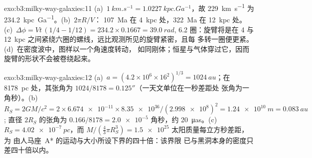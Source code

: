 \begin{solution}{exo:b3:milky-way-galaxies:11}
(a)~$\qty{1}{km.s^{-1}} = \qty{1.0227}{kpc.Ga^{-1}}$，故
\qty{229}{km.s^{-1}} 为 \qty{234.2}{kpc.Ga^{-1}}。(b)~$2\pi R/V$：
\qty{107}{Ma} 在 \qty{4}{kpc} 处，\qty{322}{Ma} 在 \qty{12}{kpc} 处。
(c)~$\Delta\phi = Vt\,(1/4 - 1/12) = 234.2\times0.1667 = \qty{39.0}{rad}$,
6.2 圈：旋臂将是在 4 与
\qty{12}{kpc} 之间紧绕六圈的螺线，远比观测所见的旋臂紧密，且每
多转一圈便更紧。(d)~在密度波中，图样以一个角速度转动，
如同刚体；恒星与气体穿过它，因而
旋臂的形状不会被卷绕起来。
\end{solution}

\begin{solution}{exo:b3:milky-way-galaxies:12}
(a)~$a = (4.2\times10^6\times16^2)^{1/3} = \qty{1024}{au}$；在
\qty{8178}{pc} 处，其张角为 $1024/8178 = \ang{;;0.125}$（一天文单位在一秒差距处
张角为一角秒）。(b)~$R_S = 2GM/c^2 = 2\times\num{6.674e-11}
\times\num{8.35e36}/(\num{2.998e8})^2 = \qty{1.24e10}{m} = \qty{0.083}{au}$;
直径 $2R_S$ 的张角为 $0.166/8178 = \num{2.0e-5}$ 角秒，约
\qty{20}{\micro as}。(c)~$R_S = \qty{4.02e-7}{pc}$，而 $M/(\tfrac43\pi
R_S^3) = \num{1.5e25}$ 太阳质量每立方秒差距，为
由人马座~A* 的运动与大小所设下界的四十倍：该界限
已与黑洞本身的密度只差四十倍以内。
\end{solution}

